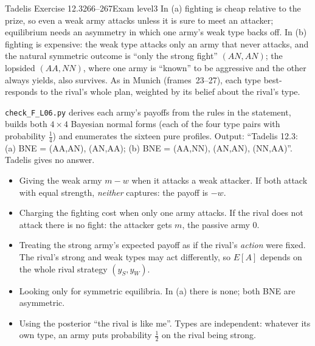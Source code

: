 \begin{exsol}{Tadelis Exercise 12.3}{266--267}{Exam level}{3}
\interp In (a) fighting is cheap relative to the prize, so even a weak army attacks unless it is sure to
meet an attacker; equilibrium needs an asymmetry in which one army's weak type backs off. In (b)
fighting is expensive: the weak type attacks only an army that never attacks, and the natural
symmetric outcome is ``only the strong fight'' $(AN, AN)$; the lopsided $(AA, NN)$, where one army is
``known'' to be aggressive and the other always yields, also survives. As in Munich (frames~23--27),
each type best-responds to the rival's whole plan, weighted by its belief about the rival's type.

\verify \texttt{check\_F\_L06.py} derives each army's payoffs from the rules in the statement, builds
both $4\times 4$ Bayesian normal forms (each of the four type pairs with probability $\frac14$) and
enumerates the sixteen pure profiles. Output: ``Tadelis 12.3: (a) BNE = (AA,AN), (AN,AA); (b) BNE =
(AA,NN), (AN,AN), (NN,AA)''. Tadelis gives no answer.

\mistakes
\begin{itemize}
  \item Giving the weak army $m - w$ when it attacks a weak attacker. If both attack with equal strength,
  \emph{neither} captures: the payoff is $-w$.
  \item Charging the fighting cost when only one army attacks. If the rival does not attack there is no
  fight: the attacker gets $m$, the passive army $0$.
  \item Treating the strong army's expected payoff as if the rival's \emph{action} were fixed. The rival's
  strong and weak types may act differently, so $E[A]$ depends on the whole rival strategy $(y_S,y_W)$.
  \item Looking only for symmetric equilibria. In (a) there is none; both BNE are asymmetric.
  \item Using the posterior ``the rival is like me''. Types are independent: whatever its own type, an army
  puts probability $\frac12$ on the rival being strong.
\end{itemize}

\end{exsol}
